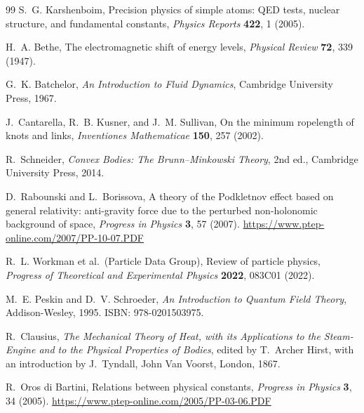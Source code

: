 \documentclass[aps,pra,preprint,longbibliography,nofootinbib]{revtex4-2}
\begin{document}
\begin{thebibliography}{99}
S.~G. Karshenboim,
Precision physics of simple atoms: QED tests, nuclear structure, and
fundamental constants,
\textit{Physics Reports} \textbf{422}, 1 (2005).

H.~A. Bethe,
The electromagnetic shift of energy levels,
\textit{Physical Review} \textbf{72}, 339 (1947).

G.~K. Batchelor,
\textit{An Introduction to Fluid Dynamics},
Cambridge University Press, 1967.


J.~Cantarella, R.~B. Kusner, and J.~M. Sullivan,
On the minimum ropelength of knots and links,
\textit{Inventiones Mathematicae} \textbf{150}, 257 (2002).

R.~Schneider,
\textit{Convex Bodies: The Brunn--Minkowski Theory}, 2nd ed.,
Cambridge University Press, 2014.

D.~Rabounski and L.~Borissova,
A theory of the Podkletnov effect based on general relativity: anti-gravity
force due to the perturbed non-holonomic background of space,
\textit{Progress in Physics} \textbf{3}, 57 (2007).
\url{https://www.ptep-online.com/2007/PP-10-07.PDF}

R.~L. Workman et al.\ (Particle Data Group),
Review of particle physics,
\textit{Progress of Theoretical and Experimental Physics}
\textbf{2022}, 083C01 (2022).

M.~E. Peskin and D.~V. Schroeder,
\textit{An Introduction to Quantum Field Theory},
Addison-Wesley, 1995.
ISBN: 978-0201503975.

R.~Clausius,
\textit{The Mechanical Theory of Heat, with its Applications to the
Steam-Engine and to the Physical Properties of Bodies},
edited by T.~Archer Hirst, with an introduction by J.~Tyndall,
John Van Voorst, London, 1867.

R.~Oros di Bartini,
Relations between physical constants,
\textit{Progress in Physics} \textbf{3}, 34 (2005).
\url{https://www.ptep-online.com/2005/PP-03-06.PDF}

\end{thebibliography}
\end{document}

